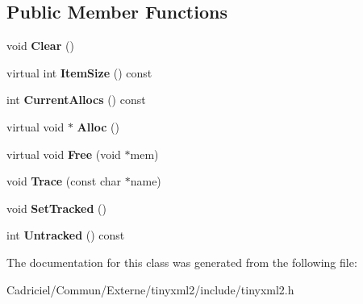 \subsection*{Public Member Functions}
\begin{DoxyCompactItemize}
\item 
void {\bfseries Clear} ()\hypertarget{classtinyxml2_1_1_mem_pool_t_a469d55e82be97d5ffeff82dd001a7029}{}\label{classtinyxml2_1_1_mem_pool_t_a469d55e82be97d5ffeff82dd001a7029}

\item 
virtual int {\bfseries Item\+Size} () const \hypertarget{classtinyxml2_1_1_mem_pool_t_a7ec8778fe99f6e332615a703be0b48bc}{}\label{classtinyxml2_1_1_mem_pool_t_a7ec8778fe99f6e332615a703be0b48bc}

\item 
int {\bfseries Current\+Allocs} () const \hypertarget{classtinyxml2_1_1_mem_pool_t_a56be11b7db6a7ef00db17088a7769aab}{}\label{classtinyxml2_1_1_mem_pool_t_a56be11b7db6a7ef00db17088a7769aab}

\item 
virtual void $\ast$ {\bfseries Alloc} ()\hypertarget{classtinyxml2_1_1_mem_pool_t_aa9d785a48ffe6ea1be679bab13464486}{}\label{classtinyxml2_1_1_mem_pool_t_aa9d785a48ffe6ea1be679bab13464486}

\item 
virtual void {\bfseries Free} (void $\ast$mem)\hypertarget{classtinyxml2_1_1_mem_pool_t_a4f1a0c434e9e3d7391e5c16ed4ee8c70}{}\label{classtinyxml2_1_1_mem_pool_t_a4f1a0c434e9e3d7391e5c16ed4ee8c70}

\item 
void {\bfseries Trace} (const char $\ast$name)\hypertarget{classtinyxml2_1_1_mem_pool_t_a0bc596f271e0f139822c534238b3f244}{}\label{classtinyxml2_1_1_mem_pool_t_a0bc596f271e0f139822c534238b3f244}

\item 
void {\bfseries Set\+Tracked} ()\hypertarget{classtinyxml2_1_1_mem_pool_t_a7798932414916199a1bc0f9c3f368521}{}\label{classtinyxml2_1_1_mem_pool_t_a7798932414916199a1bc0f9c3f368521}

\item 
int {\bfseries Untracked} () const \hypertarget{classtinyxml2_1_1_mem_pool_t_a524b90d0edeac41964c06510757dce0f}{}\label{classtinyxml2_1_1_mem_pool_t_a524b90d0edeac41964c06510757dce0f}

\end{DoxyCompactItemize}


The documentation for this class was generated from the following file\+:\begin{DoxyCompactItemize}
\item 
Cadriciel/\+Commun/\+Externe/tinyxml2/include/tinyxml2.\+h\end{DoxyCompactItemize}

